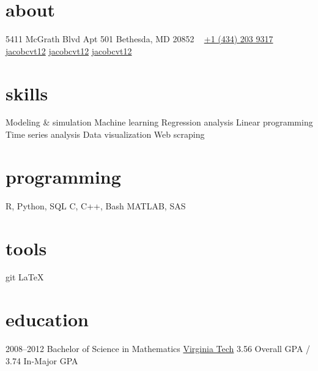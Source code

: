 \documentclass[]{friggeri-cv}
\begin{document}


\begin{aside} %
\section{about}
5411 McGrath Blvd
Apt 501
Bethesda, MD 20852
~
\href{tel:14342039317}{\faPhone +1 (434) 203 9317}
\href{mailto:jacobcvt12@gmail.com}{\faEnvelope jacobcvt12}
\href{https://github.com/jacobcvt12}{\faGithub jacobcvt12}
\href{https://www.linkedin.com/profile/view?id=240148456}{\faLinkedin jacobcvt12}
\section{skills}
Modeling \& simulation
Machine learning
Regression analysis
Linear programming
Time series analysis
Data visualization
Web scraping
\section{programming}
R, Python, SQL
C, C++, Bash
MATLAB, SAS
\section{tools}
git
\LaTeX
\end{aside}


\section{education}

\begin{entrylist}
\entry
{2008--2012}
{Bachelor {\normalfont of Science in }Mathematics}
{\href{http://www.vt.edu}{Virginia Tech}}
{3.56 Overall GPA / 3.74 In-Major GPA}
\end{entrylist}

\end{document}
